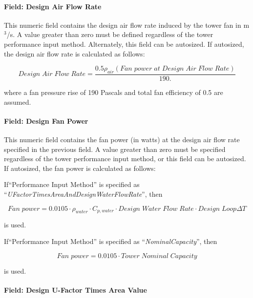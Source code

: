 \paragraph{Field: Design Air Flow Rate}\label{field-design-air-flow-rate}

This numeric field contains the design air flow rate induced by the tower fan in m\(^{3}\)/s. A value greater than zero must be defined regardless of the tower performance input method. Alternately, this field can be autosized. If autosized, the design air flow rate is calculated as follows:

\begin{equation}
Design\;Air\;Flow\;Rate = \frac{{0.5{\rho_{air}}(Fan\;power\;at\;Design\;Air\;Flow\;Rate)}}{{190.}}
\end{equation}

where a fan pressure rise of 190 Pascals and total fan efficiency of 0.5 are assumed.

\paragraph{Field: Design Fan Power}\label{field-design-fan-power}

This numeric field contains the fan power (in watts) at the design air flow rate specified in the previous field. A value greater than zero must be specified regardless of the tower performance input method, or this field can be autosized. If autosized, the fan power is calculated as follows:

If``Performance Input Method'' is specified as ``\emph{UFactorTimesAreaAndDesignWaterFlowRate}'', then

\begin{equation}
Fan\;power = 0.0105\cdot {\rho_{water}}\cdot {C_{p,water}}\cdot Design\;Water\;Flow\;Rate\cdot Design\;Loop\Delta T
\end{equation}

is used.

If``Performance Input Method'' is specified as ``\emph{NominalCapacity}'', then

\begin{equation}
Fan\;power = 0.0105\cdot Tower\;Nominal\;Capacity
\end{equation}

is used.

\paragraph{Field: Design U-Factor Times Area Value}\label{field-design-u-factor-times-area-value}


